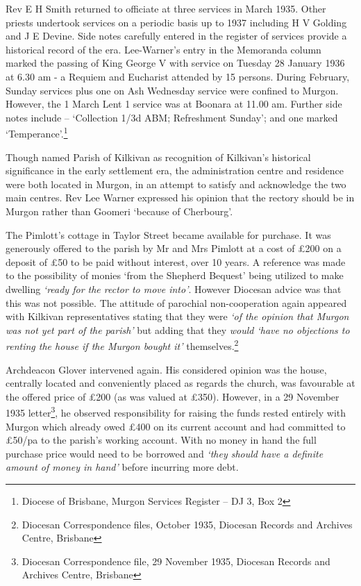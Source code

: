 Rev E H Smith returned to officiate at three services in March 1935. Other priests undertook services on a periodic basis up to 1937 including H V Golding and J E Devine. Side notes carefully entered in the register of services provide a historical record of the era. Lee-Warner's entry in the Memoranda column marked the passing of King George V with service on Tuesday 28 January 1936 at 6.30 am - a Requiem and Eucharist attended by 15 persons. During February, Sunday services plus one on Ash Wednesday service were confined to Murgon. However, the 1 March Lent 1 service was at Boonara at 11.00 am. Further side notes include -- `Collection 1/3d ABM; Refreshment Sunday'; and one marked `Temperance'.\footnote{Diocese of Brisbane, Murgon Services Register -- DJ 3, Box 2}

Though named Parish of Kilkivan as recognition of Kilkivan's historical significance in the early settlement era, the administration centre and residence were both located in Murgon, in an attempt to satisfy and acknowledge the two main centres. Rev Lee Warner expressed his opinion that the rectory should be in Murgon rather than Goomeri `because of Cherbourg'.

The Pimlott's cottage in Taylor Street became available for purchase. It was generously offered to the parish by Mr and Mrs Pimlott at a cost of £200 on a deposit of £50 to be paid without interest, over 10 years. A reference was made to the possibility of monies `from the Shepherd Bequest' being utilized to make dwelling \emph{`ready for the rector to move into'}. However Diocesan advice was that this was not possible. The attitude of parochial non-cooperation again appeared with Kilkivan representatives stating that they were \emph{`of the opinion that Murgon was not yet part of the parish'} but adding that they \emph{would `have no objections to renting the house if the Murgon bought it'} themselves.\footnote{Diocesan Correspondence files, October 1935, Diocesan Records and Archives Centre, Brisbane}

Archdeacon Glover intervened again. His considered opinion was the house, centrally located and conveniently placed as regards the church, was favourable at the offered price of £200 (as was valued at £350). However, in a 29 November 1935 letter\footnote{Diocesan Correspondence file, 29 November 1935, Diocesan Records and Archives Centre, Brisbane}, he observed responsibility for raising the funds rested entirely with Murgon which already owed £400 on its current account and had committed to £50/pa to the parish's working account. With no money in hand the full purchase price would need to be borrowed and \emph{`they should have a definite amount of money in hand'} before incurring more debt.

